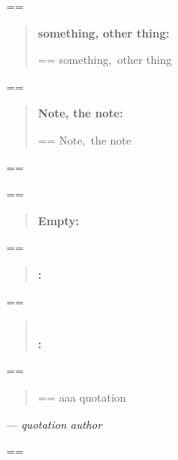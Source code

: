 \documentclass{book}
\makeatletter
\newenvironment{Texinfopreformatted}{%
  \par\GNUTobeylines\obeyspaces\frenchspacing\parskip=\z@\parindent=\z@}{}
{\catcode`\^^M=13 \gdef\GNUTobeylines{\catcode`\^^M=13 \def^^M{\null\par}}}
\newenvironment{Texinfoindented}{\begin{list}{}{}\item\relax}{\end{list}}
\renewcommand{\_}{\Texinfounderscore\discretionary{}{}{}}
\makeatother
\begin{document}
\begin{Texinfoindented}
\begin{quote}
\end{quote}
\begin{Texinfopreformatted}%
\ttfamily 
\end{Texinfopreformatted}
\begin{quote}
\textbf{something, other thing:} \begin{Texinfopreformatted}%
\ttfamily something,\ other thing
\end{Texinfopreformatted}
\end{quote}
\begin{Texinfopreformatted}%
\ttfamily 
\end{Texinfopreformatted}
\begin{quote}
\textbf{Note, the note:} \begin{Texinfopreformatted}%
\ttfamily Note,\ the note
\end{Texinfopreformatted}
\end{quote}
\begin{Texinfopreformatted}%
\ttfamily 
\end{Texinfopreformatted}
\begin{quote}
\end{quote}
\begin{Texinfopreformatted}%
\ttfamily 
\end{Texinfopreformatted}
\begin{quote}
\textbf{Empty:} \end{quote}
\begin{Texinfopreformatted}%
\ttfamily 
\end{Texinfopreformatted}
\begin{quote}
\textbf{:} \end{quote}
\begin{Texinfopreformatted}%
\ttfamily 
\end{Texinfopreformatted}
\begin{quote}
\textbf{\leavevmode{}\\:} \end{quote}
\begin{Texinfopreformatted}%
\ttfamily 
\end{Texinfopreformatted}
\begin{quote}
\begin{Texinfopreformatted}%
\ttfamily aaa quotation
\end{Texinfopreformatted}
\end{quote}
\begin{center}
--- \emph{quotation author}
\end{center}
\begin{Texinfopreformatted}%

\end{Texinfopreformatted}
\end{Texinfoindented}
\end{document}
